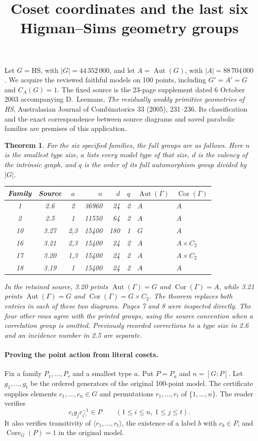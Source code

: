 \documentclass[11pt]{article}
\title{Coset coordinates and the last six Higman--Sims geometry groups}
\author{}\date{}
\newtheorem{theorem}{Theorem}\newtheorem{lemma}[theorem]{Lemma}
\newcommand{\Aut}{\operatorname{Aut}}\newcommand{\Cor}{\operatorname{Cor}}
\begin{document}
\maketitle
Let $G=\mathrm{HS}$, with $|G|=44\,352\,000$, and let $A=\Aut(G)$,
with $|A|=88\,704\,000$. We acquire the reviewed faithful models on
100 points, including $G'=A'=G$ and $C_A(G)=1$. The fixed source is the
23-page supplement dated 6 October 2003 accompanying D.~Leemans,
\emph{The residually weakly primitive geometries of HS}, Australasian
Journal of Combinatorics 33 (2005), 231--236. Its classification and the
exact correspondence between source diagrams and saved parabolic families
are premises of this application.

\begin{theorem}
For the six specified families, the full groups are as follows. Here $n$
is the smallest type size, $a$ lists every model type of that size, $d$
is the valency of the intrinsic graph, and $q$ is the order of its full
automorphism group divided by $|G|$.
\begin{center}\small
\begin{tabular}{cccrrcll}\toprule
Family&Source&$a$&$n$&$d$&$q$&$\Aut(\Gamma)$&$\Cor(\Gamma)$\\\midrule
1&2.6&2&36960&24&2&$A$&$A$\\
2&2.5&1&11550&64&2&$A$&$A$\\
10&3.27&2,3&15400&180&1&$G$&$A$\\
16&3.21&2,3&15400&24&2&$A$&$A\times C_2$\\
17&3.20&1,3&15400&24&2&$A$&$A\times C_2$\\
18&3.19&1&15400&24&2&$A$&$A$\\\bottomrule
\end{tabular}
\end{center}
In the retained source, 3.20 prints $\Aut(\Gamma)=G$ and
$\Cor(\Gamma)=A$, while 3.21 prints $\Aut(\Gamma)=G$ and
$\Cor(\Gamma)=G\times C_2$. The theorem replaces both entries in each
of these two diagrams. Pages 7 and 8 were inspected directly. The four
other rows agree with the printed groups, using the source convention
when a correlation group is omitted. Previously recorded corrections
to a type size in 2.6 and an incidence number in 2.5 are separate.
\end{theorem}

\paragraph{Proving the point action from literal cosets.}
Fix a family $P_1,\ldots,P_r$ and a smallest type $a$. Put $P=P_a$ and
$n=[G:P]$. Let $g_1,\ldots,g_t$ be the ordered generators of the original
100-point model. The certificate supplies elements $c_1,\ldots,c_n\in G$
and permutations $r_1,\ldots,r_t$ of $\{1,\ldots,n\}$. The reader verifies
\begin{equation}\label{edges}
 c_i g_j c_{i^{r_j}}^{-1}\in P\qquad(1\le i\le n,\ 1\le j\le t).
\end{equation}
It also verifies transitivity of $\langle r_1,\ldots,r_t\rangle$, the
existence of a label $b$ with $c_b\in P$, and $\operatorname{Core}_G(P)=1$
in the original model.
\end{document}
